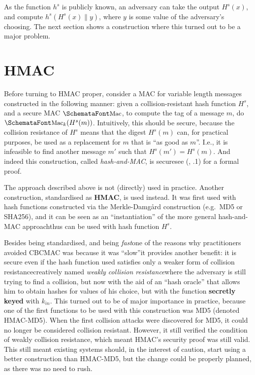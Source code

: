    As the function $h^s$ is publicly known, an adversary can take the output $H^s(x)$, and compute $h^s(H^s(x)\|y)$, where $y$ is some value of the adversary's choosing. The next section shows a construction where this turned out to be a major problem.

\section{HMAC}
  \label{sec:hmac}
  Before turning to HMAC proper, consider a MAC for variable length messages constructed in the following manner: given a collision-resistant hash function $H^s$, and a secure MAC $\myemph{Mac}$, to compute the tag of a message $m$, do $\myemph{Mac}_k(H^s(m))$. Intuitively, this should be secure, because the collision resistance of $H^s$ means that the digest $H^s(m)$ can, for practical purposes, be used as a replacement for $m$ that is ``as good as $m$''. I.e., it is infeasible to find another message $m'$ such that $H^s(m') = H^s(m)$. And indeed this construction, called \emph{hash-and-MAC}, is secure\emd see (\cite{KatzLindell:IMC}, .1) for a formal proof.

  The approach described above is not (directly) used in practice. Another construction, standardised as \textbf{HMAC}, is used instead. It was first used with hash functions constructed via the Merkle-Damgård construction (e.g.\ MD5 or SHA256), and it can be seen as an ``instantiation'' of the more general hash-and-MAC approach\emd thus can be used with hash function $H^s$.

  Besides being standardised, and being \emph{fast}\emd one of the reasons why practitioners avoided CBCMAC was because it was ``slow''\emd it provides another benefit: it is secure even if the hash function used satisfies only a weaker form of collision resistance\emd creatively named \emph{weakly collision resistance}\emd where the adversary is still trying to find a collision, but now with the aid of an ``hash oracle'' that allows him to obtain hashes for values of his choice, but with the function \textbf{secretly keyed} with $k_{in}$. This turned out to be of major importance in practice, because one of the first functions to be used with this construction was MD5 (denoted HMAC-MD5). When the first collision attacks were discovered for MD5, it could no longer be considered collision resistant. However, it still verified the condition of weakly collision resistance, which meant HMAC's security proof was still valid. This still meant existing systems should, in the interest of caution, start using a better construction than HMAC-MD5, but the change could be properly planned, as there was no need to rush.

